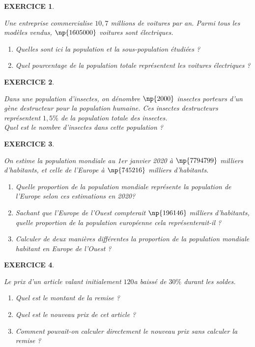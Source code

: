 \documentclass[a4paper]{article}   %
\renewcommand{\(}{\left(}
\renewcommand{\)}{\right)}
\newtheorem{EXO}{\large EXERCICE }
\newenvironment{EX}   { \setcounter{ques}{0} \begin{EXO} \hrulefill ~\vspace{0.3cm}

\normalfont}    {\end{EXO} \medskip}
\begin{document}
\begin{center} 	
\end{center}
\medskip
\begin{EX} Une entreprise commercialise $10,7$ millions de voitures par an. Parmi tous les modèles vendus, $\np{1605000}$ voitures sont électriques.
\begin{enumerate}
\item Quelles sont ici la population et la sous-population étudiées ? 
\item Quel pourcentage de la population totale représentent les voitures électriques ?
\end{enumerate}
\end{EX}
\begin{EX}Dans une population d'insectes, on dénombre $\np{2000}$ insectes porteurs d'un gène destructeur pour la population humaine. Ces insectes destructeurs représentent $1,5\%$ de la population totale des insectes. \\
Quel est le nombre d'insectes dans cette population ?
\end{EX}
\begin{EX} On estime la population mondiale au 1er janvier 2020 à $\np{7 794 799}$ milliers d'habitants, et celle de l'Europe à $\np{745216}$ milliers d'habitants.
\begin{enumerate}
\item Quelle proportion de la population mondiale représente la population de l'Europe selon ces estimations en 2020?
\item Sachant que l'Europe de l'Ouest compterait $\np{196146}$ milliers d'habitants, quelle proportion de la population européenne cela représenterait-il ?
\item Calculer de deux manières différentes la proportion de la population mondiale habitant en Europe de l'Ouest ?
\end{enumerate}
\end{EX}
\begin{EX} Le prix d'un article valant initialement $120$\EUR a baissé de $30\%$ durant les soldes. 
\begin{enumerate}
\item Quel est le montant de la remise ?
\item Quel est le nouveau prix de cet article ?
\item Comment pouvait-on calculer directement le nouveau prix sans calculer la remise ?
\end{enumerate}
\end{EX}
\end{document}
